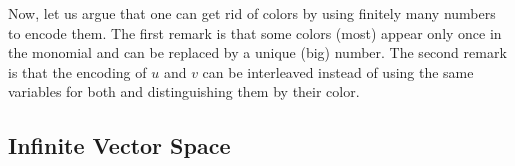Now, let us argue that one can get rid of colors by using 
finitely many numbers to encode them. 
The first remark is that some colors (most) appear only once 
in the monomial and can be replaced by a unique (big) number.
The second remark is that the encoding of $u$ and $v$ can be interleaved
instead of using the same variables for both and distinguishing them
by their color. 

\subsection{Infinite Vector Space}
\label{subsec:vector}





